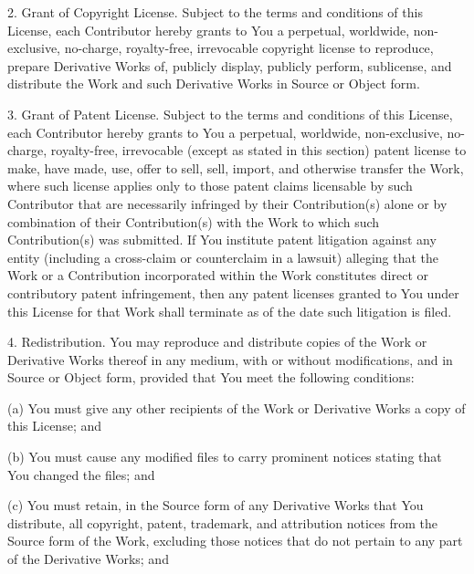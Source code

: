 \documentclass[a4paper,twoside]{tceusermanual}
\begin{document}
   2. Grant of Copyright License. Subject to the terms and conditions of
      this License, each Contributor hereby grants to You a perpetual,
      worldwide, non-exclusive, no-charge, royalty-free, irrevocable
      copyright license to reproduce, prepare Derivative Works of,
      publicly display, publicly perform, sublicense, and distribute the
      Work and such Derivative Works in Source or Object form.

   3. Grant of Patent License. Subject to the terms and conditions of
      this License, each Contributor hereby grants to You a perpetual,
      worldwide, non-exclusive, no-charge, royalty-free, irrevocable
      (except as stated in this section) patent license to make, have made,
      use, offer to sell, sell, import, and otherwise transfer the Work,
      where such license applies only to those patent claims licensable
      by such Contributor that are necessarily infringed by their
      Contribution(s) alone or by combination of their Contribution(s)
      with the Work to which such Contribution(s) was submitted. If You
      institute patent litigation against any entity (including a
      cross-claim or counterclaim in a lawsuit) alleging that the Work
      or a Contribution incorporated within the Work constitutes direct
      or contributory patent infringement, then any patent licenses
      granted to You under this License for that Work shall terminate
      as of the date such litigation is filed.

   4. Redistribution. You may reproduce and distribute copies of the
      Work or Derivative Works thereof in any medium, with or without
      modifications, and in Source or Object form, provided that You
      meet the following conditions:

      (a) You must give any other recipients of the Work or
          Derivative Works a copy of this License; and

      (b) You must cause any modified files to carry prominent notices
          stating that You changed the files; and

      (c) You must retain, in the Source form of any Derivative Works
          that You distribute, all copyright, patent, trademark, and
          attribution notices from the Source form of the Work,
          excluding those notices that do not pertain to any part of
          the Derivative Works; and
\end{document}
